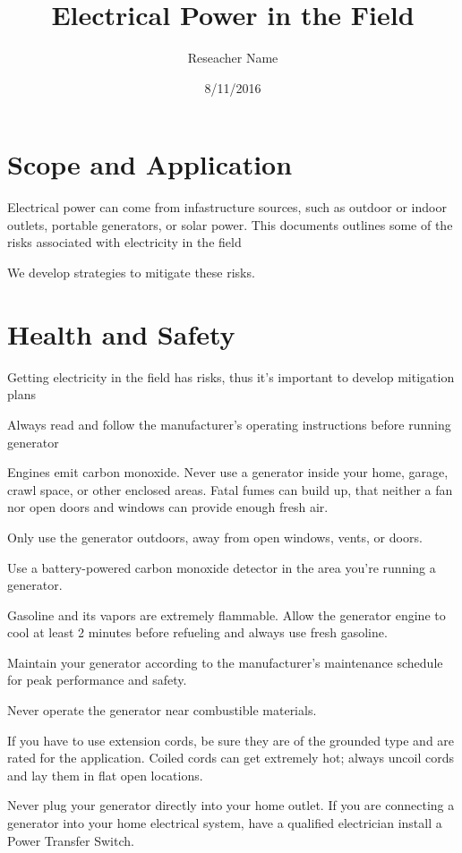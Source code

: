 \documentclass[12pt]{../SOP3_alpha}
\title{Electrical Power in the Field}
\date{8/11/2016}
\author{Reseacher Name}
\begin{document}


\maketitle

\section{Scope and Application}

\NP Electrical power can come from infastructure sources, such as outdoor or indoor outlets, portable generators, or solar power.
\NP This documents outlines some of the risks associated with electricity in the field

\NP We develop strategies to mitigate these risks.

\section{Health and Safety}

\NP Getting electricity in the field has risks, thus it's important to develop mitigation plans

\NP Always read and follow the manufacturer's operating instructions before running
generator

\NP Engines emit carbon monoxide. Never use a generator inside your home, garage, crawl space, or other enclosed areas. Fatal fumes can build up, that neither a fan nor open doors and windows can provide enough fresh air.

\NP Only use the generator outdoors, away from open windows, vents, or doors.

\NP Use a battery-powered carbon monoxide detector in the area you're running a generator.

\NP Gasoline and its vapors are extremely flammable. Allow the generator engine to cool at least 2 minutes before refueling and always use fresh gasoline. 

\NP Maintain your generator according to the manufacturer’s maintenance schedule for peak performance and safety.

\NP Never operate the generator near combustible materials.

\NP If you have to use extension cords, be sure they are of the grounded type and are rated for the application. Coiled cords can get extremely hot; always uncoil cords and lay them in flat open locations.

\NP Never plug your generator directly into your home outlet. If you are connecting a generator into your home electrical system, have a qualified electrician install a Power Transfer Switch.
\end{document}
